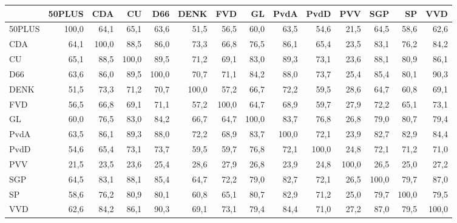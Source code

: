 \begin{tabular}{lrrrrrrrrrrrrr}
\toprule
{} &  50PLUS &    CDA &     CU &    D66 &   DENK &    FVD &     GL &   PvdA &   PvdD &    PVV &    SGP &     SP &    VVD \\
\midrule
50PLUS &   100,0 &   64,1 &   65,1 &   63,6 &   51,5 &   56,5 &   60,0 &   63,5 &   54,6 &   21,5 &   64,5 &   58,6 &   62,6 \\
CDA    &    64,1 &  100,0 &   88,5 &   86,0 &   73,3 &   66,8 &   76,5 &   86,1 &   65,4 &   23,5 &   83,1 &   76,2 &   84,2 \\
CU     &    65,1 &   88,5 &  100,0 &   89,5 &   71,2 &   69,1 &   83,0 &   89,3 &   73,1 &   23,6 &   88,1 &   80,9 &   86,1 \\
D66    &    63,6 &   86,0 &   89,5 &  100,0 &   70,7 &   71,1 &   84,2 &   88,0 &   73,7 &   25,4 &   85,4 &   80,1 &   90,3 \\
DENK   &    51,5 &   73,3 &   71,2 &   70,7 &  100,0 &   57,2 &   66,7 &   72,2 &   59,5 &   28,6 &   64,7 &   60,8 &   69,1 \\
FVD    &    56,5 &   66,8 &   69,1 &   71,1 &   57,2 &  100,0 &   64,7 &   68,9 &   59,7 &   27,9 &   72,2 &   65,1 &   73,1 \\
GL     &    60,0 &   76,5 &   83,0 &   84,2 &   66,7 &   64,7 &  100,0 &   83,7 &   76,8 &   26,8 &   79,0 &   80,7 &   79,4 \\
PvdA   &    63,5 &   86,1 &   89,3 &   88,0 &   72,2 &   68,9 &   83,7 &  100,0 &   72,1 &   23,9 &   82,7 &   82,9 &   84,4 \\
PvdD   &    54,6 &   65,4 &   73,1 &   73,7 &   59,5 &   59,7 &   76,8 &   72,1 &  100,0 &   24,8 &   72,1 &   71,2 &   71,0 \\
PVV    &    21,5 &   23,5 &   23,6 &   25,4 &   28,6 &   27,9 &   26,8 &   23,9 &   24,8 &  100,0 &   26,5 &   25,0 &   27,2 \\
SGP    &    64,5 &   83,1 &   88,1 &   85,4 &   64,7 &   72,2 &   79,0 &   82,7 &   72,1 &   26,5 &  100,0 &   79,7 &   87,0 \\
SP     &    58,6 &   76,2 &   80,9 &   80,1 &   60,8 &   65,1 &   80,7 &   82,9 &   71,2 &   25,0 &   79,7 &  100,0 &   79,5 \\
VVD    &    62,6 &   84,2 &   86,1 &   90,3 &   69,1 &   73,1 &   79,4 &   84,4 &   71,0 &   27,2 &   87,0 &   79,5 &  100,0 \\
\bottomrule
\end{tabular}
